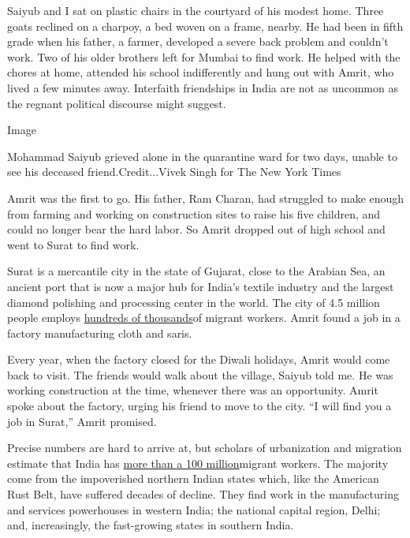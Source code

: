 Saiyub and I sat on plastic chairs in the courtyard of his modest home.
Three goats reclined on a charpoy, a bed woven on a frame, nearby. He
had been in fifth grade when his father, a farmer, developed a severe
back problem and couldn't work. Two of his older brothers left for
Mumbai to find work. He helped with the chores at home, attended his
school indifferently and hung out with Amrit, who lived a few minutes
away. Interfaith friendships in India are not as uncommon as the regnant
political discourse might suggest.

Image

Mohammad Saiyub grieved alone in the quarantine ward for two days,
unable to see his deceased friend.Credit...Vivek Singh for The New York
Times

Amrit was the first to go. His father, Ram Charan, had struggled to make
enough from farming and working on construction sites to raise his five
children, and could no longer bear the hard labor. So Amrit dropped out
of high school and went to Surat to find work.

Surat is a mercantile city in the state of Gujarat, close to the Arabian
Sea, an ancient port that is now a major hub for India's textile
industry and the largest diamond polishing and processing center in the
world. The city of 4.5 million people employs
\href{https://www.financialexpress.com/india-news/lakhs-of-migrant-workers-in-surat-desperate-to-return-to-their-native-states/1943533/}{hundreds
of thousands}of migrant workers. Amrit found a job in a factory
manufacturing cloth and saris.

Every year, when the factory closed for the Diwali holidays, Amrit would
come back to visit. The friends would walk about the village, Saiyub
told me. He was working construction at the time, whenever there was an
opportunity. Amrit spoke about the factory, urging his friend to move to
the city. ``I will find you a job in Surat,'' Amrit promised.

Precise numbers are hard to arrive at, but scholars of urbanization and
migration estimate that India has
\href{https://indianexpress.com/article/explained/coronavirus-india-lockdown-migran-workers-mass-exodus-6348834/}{more
than a 100 million}migrant workers. The majority come from the
impoverished northern Indian states which, like the American Rust Belt,
have suffered decades of decline. They find work in the manufacturing
and services powerhouses in western India; the national capital region,
Delhi; and, increasingly, the fast-growing states in southern India.

